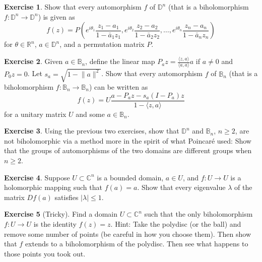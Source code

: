 \documentclass[12pt,openany]{book}
\newcommand{\linnprod}[2]{\langle #1 , #2 \rangle}
\newcommand{\sabs}[1]{\lvert {#1} \rvert}
\newcommand{\snorm}[1]{\lVert {#1} \rVert}
\newcommand{\C}{{\mathbb{C}}}
\newcommand{\R}{{\mathbb{R}}}
\newcommand{\D}{{\mathbb{D}}}
\newcommand{\bB}{{\mathbb{B}}}
\theoremstyle{plain}
\theoremstyle{remark}
\theoremstyle{definition}
\newenvironment{exbox}{%
    \def\FrameCommand{\vrule width 1pt \relax\hspace {10pt}}%
    \MakeFramed {\advance \hsize -\width \FrameRestore }%
}{%
    \endMakeFramed
}
\theoremstyle{exercise}
\newtheorem{exercise}{Exercise}[section]
\theoremstyle{example}
\begin{document}
\begin{exbox}
\begin{exercise}
Show that every automorphism $f$ of $\D^n$ (that is a biholomorphism $f \colon \D^n \to \D^n$)
is given as
\begin{equation*}
f(z) = P \left(
e^{i\theta_1} \frac{z_1-a_1}{1-\bar{a}_1z_1} ,
e^{i\theta_2} \frac{z_2-a_2}{1-\bar{a}_2z_2} , \ldots,
e^{i\theta_n} \frac{z_n-a_n}{1-\bar{a}_nz_n} \right)
\end{equation*}
for $\theta \in \R^n$, $a \in \D^n$, and
a permutation matrix $P$.
\end{exercise}

\begin{exercise}
Given $a \in \bB_n$, define the linear map $P_a z =
\frac{\linnprod{z}{a}}{\linnprod{a}{a}}a$ if $a \not= 0$ and $P_0z = 0$.
Let $s_a = \sqrt{1-\snorm{a}^2}$.  Show that every automorphism $f$ of
$\bB_n$ (that is a biholomorphism $f \colon \bB_n \to \bB_n$)
can be written as
\begin{equation*}
f(z) = U \frac{a-P_az-s_a(I-P_a)z}{1-\linnprod{z}{a}}
\end{equation*}
for a unitary matrix $U$ and some $a \in \bB_n$.
\end{exercise}

\begin{exercise}
Using the previous two exercises, show that $\D^n$ and $\bB_n$, $n \geq 2$,
are not biholomorphic via a method more in the spirit of what Poincar\'e
used: Show that the groups of automorphisms of the two domains are
different groups when $n \geq 2$.
\end{exercise}

\begin{exercise}
Suppose $U \subset \C^n$ is a bounded domain, $a \in U$, and $f \colon U \to U$ is a
holomorphic mapping such that $f(a) = a$.  Show that every eigenvalue
$\lambda$ of the matrix $Df(a)$ satisfies $\sabs{\lambda} \leq 1$.
\end{exercise}

\begin{exercise}[Tricky]
Find a domain $U \subset \C^n$ such that the only biholomorphism $f \colon U
\to U$ is the identity $f(z) = z$.  Hint: Take the polydisc (or the ball)
and remove some number of points (be careful in how you choose them).  Then
show that $f$ extends to a biholomorphism of the polydisc.  Then see what
happens to those points you took out.
\end{exercise}
\end{exbox}
\end{document}
